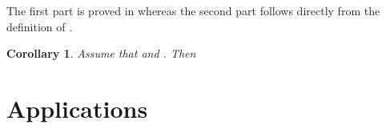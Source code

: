 \documentclass[submission]{eptcs}
\newtheorem{corollary}[theorem]{Corollary}
\newenvironment{proof}[1][Proof]{\begin{trivlist}
\item[\hskip \labelsep {\bfseries #1}]}{\end{trivlist}}
\begin{document}
\begin{proof}
  The first part is proved in \cite{AILS2011} whereas the second part
  follows directly from the definition of .
\end{proof}
\begin{corollary}\label{L:Phiiso}
  Assume that  and . Then 

\iffalse
\begin{itemize}
\item  \emph{expresses}   iff
  , and
\item  \emph{characterizes}   iff  \emph{expresses}   .
\end{itemize}\fi
 \end{corollary}
\section{Applications}
\end{document}
